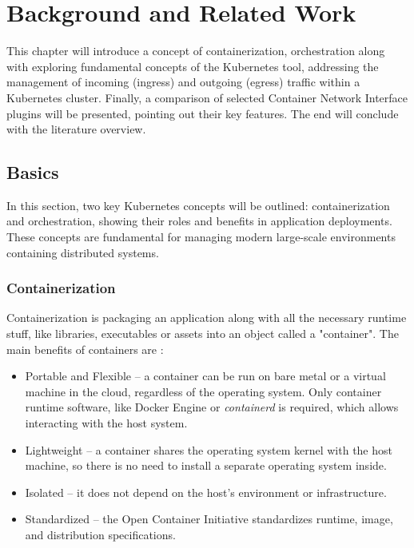\chapter{Background and Related Work}
\label{cha:background}

This chapter will introduce a concept of containerization, orchestration along with exploring fundamental concepts of the Kubernetes tool, addressing the management of incoming (ingress) and outgoing (egress) traffic within a Kubernetes cluster. Finally, a comparison of selected Container Network Interface plugins will be presented, pointing out their key features. The end will conclude with the literature overview.


\section{Basics}
\label{sec:basics}

In this section, two key Kubernetes concepts will be outlined: containerization and orchestration, showing their roles and benefits in application deployments. These concepts are fundamental for managing modern large-scale environments containing distributed systems.

\subsection{Containerization}
\label{sec:containerization}

Containerization is packaging an application along with all the necessary runtime stuff, like libraries, executables or assets into an object called a "container". The main benefits of containers are \cite{RedhatContainerization}: 

\begin{itemize} 
    \item Portable and Flexible -- a container can be run on bare metal or a virtual machine in the cloud, regardless of the operating system. Only container runtime software, like Docker Engine or \textit{containerd} is required, which allows interacting with the host system. 

    \item Lightweight -- a container shares the operating system kernel with the host machine, so there is no need to install a separate operating system inside. 

    \item Isolated -- it does not depend on the host's environment or infrastructure. 

    \item Standardized -- the Open Container Initiative standardizes runtime, image, and distribution specifications. 
\end{itemize}


